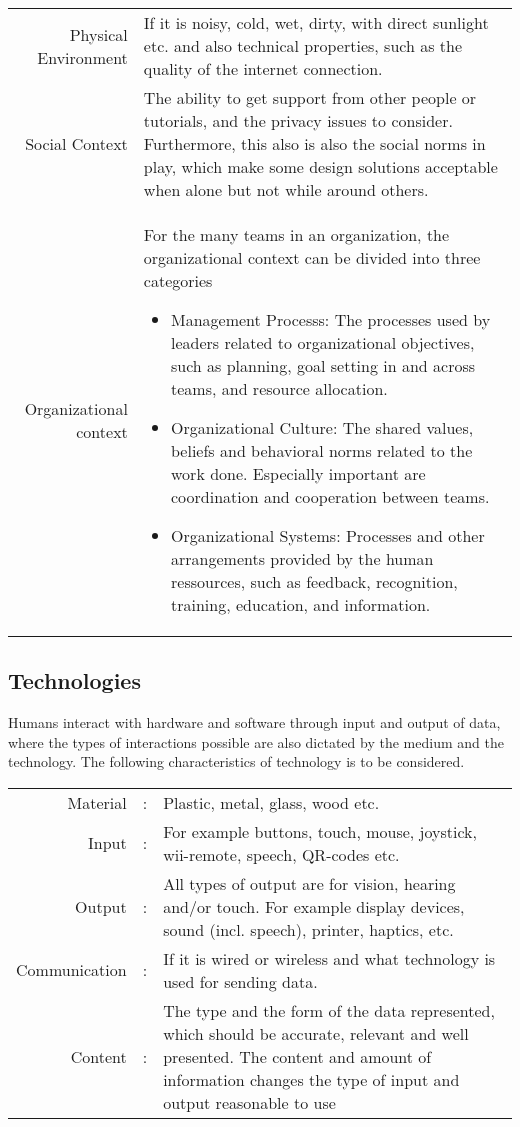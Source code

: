 \noindent
\begin{longtable}{r>{\raggedright\arraybackslash}p{}}
  Physical Environment &
  If it is noisy, cold, wet, dirty, with direct sunlight etc. and also technical properties, such as the quality of the internet connection.
  \\
  Social Context &
  The ability to get support from other people or tutorials, and the privacy issues to consider. Furthermore, this also is  also the social norms in play, which make some design solutions acceptable when alone but not while around others. 
  \\
  Organizational context &
  For the many teams in an organization, the organizational context can be divided into three categories \cite[p. 286]{doolen}
  \begin{itemize}
    \item Management Processs:
      The processes used by leaders related to organizational objectives, such as planning, goal setting in and across teams, and resource allocation.

    \item Organizational Culture:
      The shared values, beliefs and behavioral norms related to the work done. Especially important are coordination and cooperation between teams.
      
    \item Organizational Systems:
      Processes and other arrangements provided by the human ressources, such as feedback, recognition, training, education, and information.
  \end{itemize}
\end{longtable}

\subsection{Technologies}
Humans interact with hardware and software through input and output of data, where the types of interactions possible are also dictated by the medium and the technology. The following characteristics of technology is to be considered. \cite[p. 36-43]{benyon14}

\noindent
\begin{longtable}{rc>{\raggedright\arraybackslash}p{}}
  Material & : &
  Plastic, metal, glass, wood etc.
  \\
  Input & : &
  For example buttons, touch, mouse, joystick, wii-remote, speech, QR-codes etc.
  \\
  Output & : &
  All types of output are for vision, hearing and/or touch. For example display devices, sound (incl. speech), printer, haptics,  etc.
  \\
  Communication & : &
  If it is wired or wireless and what technology is used for sending data.
  \\
  Content & : &
  The type and the form of the data represented, which should be accurate, relevant and well presented. The content and amount of information changes the type of input and output reasonable to use
\end{longtable}
